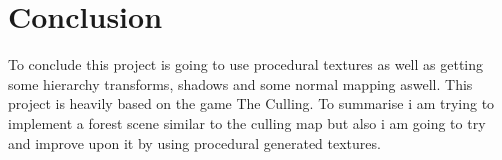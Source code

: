 \documentclass[10pt, a4paper]{article}
\newcommand{\figuremacro}[5]{
    \begin{figure}[#1]
        \centering
        \texttt{[image: \#2]}
        \caption[#3]{\textbf{#3}#4}
        \label{fig:#2}
    \end{figure}
}
\begin{document}
	\section{Conclusion}
	To conclude this project is going to use procedural textures as well as getting some hierarchy transforms, shadows and some normal mapping aswell.  This project is heavily based on the game The Culling.  To summarise i am trying to implement a forest scene similar to the culling map but also i am going to try and improve upon it by using procedural generated textures.  
	
	
	
	
    
	
    
    
    
    
	
\end{document}
